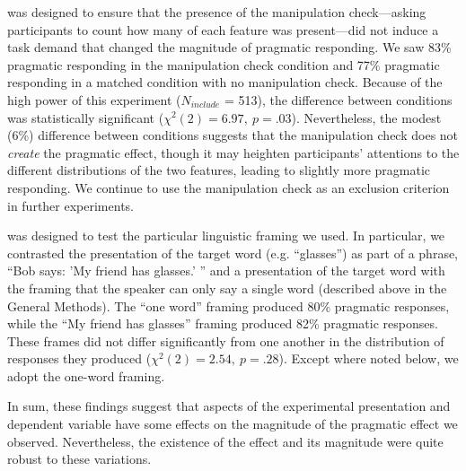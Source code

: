  was designed to ensure that the presence of the manipulation check---asking participants to count how many of each feature was present---did not induce a task demand that changed the magnitude of pragmatic responding. We saw 83\% pragmatic responding in the manipulation check condition and 77\% pragmatic responding in a matched condition with no manipulation check. Because of the high power of this experiment ($N_{include}$ = 513), the difference between conditions was statistically significant ($\chi^2(2) = 6.97,~p = .03$). Nevertheless, the modest (6\%) difference between conditions suggests that the manipulation check does not \emph{create} the pragmatic effect, though it may heighten participants' attentions to the different distributions of the two features, leading to slightly more pragmatic responding. We continue to use the manipulation check as an exclusion criterion in further experiments. 

 was designed to test the particular linguistic framing we used. In particular, we contrasted the presentation of the target word (e.g. ``glasses'') as part of a phrase, ``Bob says: 'My friend has glasses.' '' and a presentation of the target word with the framing that the speaker can only say a single word (described above in the General Methods). The ``one word'' framing produced 80\% pragmatic responses, while the ``My friend has glasses'' framing produced 82\% pragmatic responses. These frames did not differ significantly from one another in the distribution of responses they produced ($\chi^2(2) = 2.54,~p = .28$). Except where noted below, we adopt the one-word framing. 

In sum, these findings suggest that aspects of the experimental presentation and dependent variable have some effects on the magnitude of the pragmatic effect we observed. Nevertheless, the existence of the effect and its magnitude were quite robust to these variations. 

